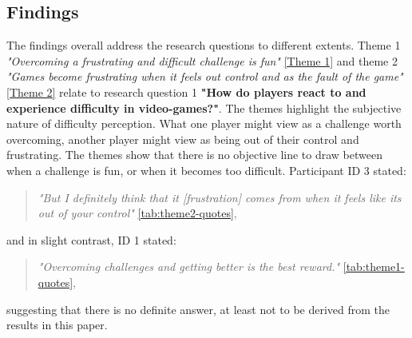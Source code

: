 \subsection{Findings}

The findings overall address the research questions to different extents. Theme 1 \textit{"Overcoming a frustrating and difficult challenge is fun"} \ref{Theme 1} and theme 2 \textit{"Games become frustrating when it feels out control and as the fault of the game"} \ref{Theme 2} relate to research question 1 \textbf{"How do players react to and experience difficulty in video-games?"}. The themes highlight the subjective nature of difficulty perception. What one player might view as a challenge worth overcoming, another player might view as being out of their control and frustrating. The themes show that there is no objective line to draw between when a challenge is fun, or when it becomes too difficult. Participant ID 3 stated: 
\begin{quote}
    \textit{"But I definitely think that it [frustration] comes from when it feels like its out of your control"} \ref{tab:theme2-quotes},
\end{quote}
and in slight contrast, ID 1 stated:
\begin{quote}
    \textit{"Overcoming challenges and getting better is the best reward."} \ref{tab:theme1-quotes},
\end{quote}
suggesting that there is no definite answer, at least not to be derived from the results in this paper. 

